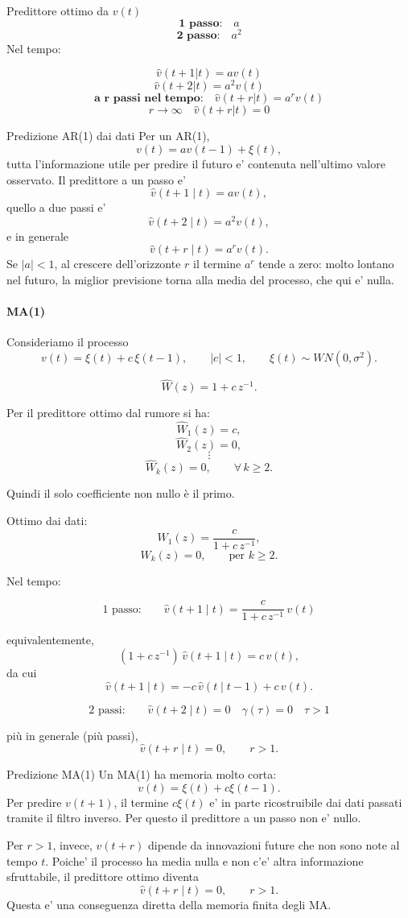 \documentclass[11pt,a4paper]{article}
\begin{document}
Predittore ottimo da $v(t)$
\[
\textbf{1 passo:} \quad a
\]
\[
\textbf{2 passo:} \quad a^2
\]
Nel tempo:

\[
\hat v(t+1|t) = av(t)
\]
\[
\hat v(t+2|t) = a^2v(t)
\]
\[
\textbf{a r passi nel tempo:} \quad \hat v(t+r|t) = a^rv(t)
\]
\[
r\to\infty \quad \hat v(t+r|t) = 0
\]

\begin{spiegazione}{Predizione AR(1) dai dati}
Per un AR(1),
\[
v(t)=av(t-1)+\xi(t),
\]
tutta l'informazione utile per predire il futuro e' contenuta nell'ultimo valore osservato. Il predittore a un passo e'
\[
\hat v(t+1\mid t)=av(t),
\]
quello a due passi e'
\[
\hat v(t+2\mid t)=a^2v(t),
\]
e in generale
\[
\hat v(t+r\mid t)=a^rv(t).
\]
Se $|a|<1$, al crescere dell'orizzonte $r$ il termine $a^r$ tende a zero: molto lontano nel futuro, la miglior previsione torna alla media del processo, che qui e' nulla.
\end{spiegazione}


\paragraph{MA(1)}

Consideriamo il processo
\[
v(t)=\xi(t)+c\,\xi(t-1),
\qquad |c|<1,
\qquad \xi(t)\sim WN(0,\sigma^2).
\]

\[
\hat W(z)=1+c\,z^{-1}.
\]


Per il predittore ottimo dal rumore si ha:
\[
\hat W_1(z)=c,
\]
\[
\hat W_2(z)=0,
\]
\[
\vdots
\]
\[
\hat W_k(z)=0,
\qquad \forall\, k\geq 2.
\]

Quindi il solo coefficiente non nullo è il primo.

\medskip

Ottimo dai dati:
\[
W_1(z)=\frac{c}{1+c\,z^{-1}},
\]
\[
W_k(z)=0,
\qquad \text{per } k\geq 2.
\]

\medskip

Nel tempo:

\[
\text{1 passo:}
\qquad
\hat v(t+1\mid t)=\frac{c}{1+c\,z^{-1}}\,v(t)
\]

equivalentemente,
\[
(1+c\,z^{-1})\,\hat v(t+1\mid t)=c\,v(t),
\]
da cui
\[
\hat v(t+1\mid t)=-c\,\hat v(t\mid t-1)+c\,v(t).
\]

\medskip

\[
\text{2 passi:}
\qquad
\hat v(t+2\mid t)=0 \quad \gamma(\tau) =0 \quad \tau>1
\]

più in generale (più passi),
\[
\hat v(t+r\mid t)=0,
\qquad r>1.
\]

\begin{spiegazione}{Predizione MA(1)}
Un MA(1) ha memoria molto corta:
\[
v(t)=\xi(t)+c\xi(t-1).
\]
Per predire $v(t+1)$, il termine $c\xi(t)$ e' in parte ricostruibile dai dati passati tramite il filtro inverso. Per questo il predittore a un passo non e' nullo.

Per $r>1$, invece, $v(t+r)$ dipende da innovazioni future che non sono note al tempo $t$. Poiche' il processo ha media nulla e non c'e' altra informazione sfruttabile, il predittore ottimo diventa
\[
\hat v(t+r\mid t)=0,\qquad r>1.
\]
Questa e' una conseguenza diretta della memoria finita degli MA.
\end{spiegazione}
\end{document}
